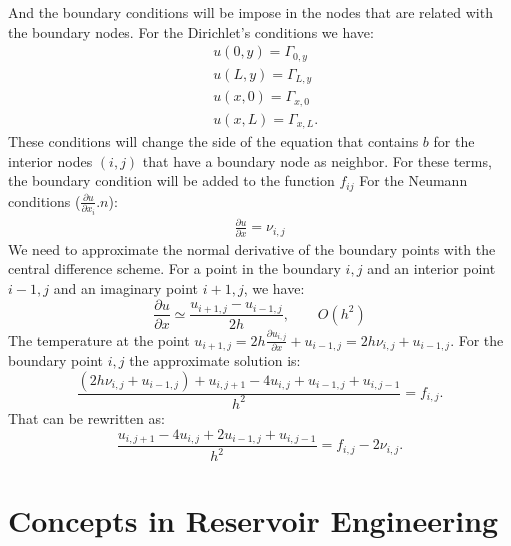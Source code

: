 \documentclass[12pt]{report}
\begin{document}
And the boundary conditions will be impose in the nodes that are related with the boundary nodes.
For the Dirichlet's conditions we have:
\begin{align*}
&u(0,y)=\Gamma_{0,y}\\
&u(L,y)=\Gamma_{L,y}\\
&u(x,0)=\Gamma_{x,0}\\
&u(x,L)=\Gamma_{x,L}.
\end{align*}
These conditions will change the side of the equation that contains $b$ for the interior nodes $(i,j)$ that have a boundary node as neighbor.
For these terms, the boundary condition will be added to the function $f_{ij}$
For the Neumann conditions ($\frac{\partial u}{\partial x_i}. n$):
\begin{align*}
\frac{\partial u}{\partial x}=\nu_{i,j}
\end{align*}
We need to approximate the normal derivative of the boundary points with the central difference scheme. For a point
in the boundary $i,j$ and an interior point $i-1,j$ and an imaginary point $i+1,j$, we have:
\begin{equation*}
\frac{\partial u}{\partial x}\simeq\frac{u_{i+1,j}-u_{i-1,j}}{2h},\qquad O(h^2)
\end{equation*}
The temperature at the point $u_{i+1,j}=2h\frac{\partial u_{i,j}}{\partial x}+u_{i-1,j}=2h\nu_{i,j}+u_{i-1,j}$. 
For the boundary point $i,j$ the approximate solution is:
\begin{equation*}
\frac{(2h\nu_{i,j}+u_{i-1,j})+u_{i,j+1}-4u_{i,j}+u_{i-1,j}+u_{i,j-1}}{h^2}=f_{i,j}.
\end{equation*}
That can be rewritten as:
\begin{equation*}
\frac{u_{i,j+1}-4u_{i,j}+2u_{i-1,j}+u_{i,j-1}}{h^2}=f_{i,j}-2\nu_{i,j}.
\end{equation*}


\chapter{Concepts in Reservoir Engineering}
\end{document}
